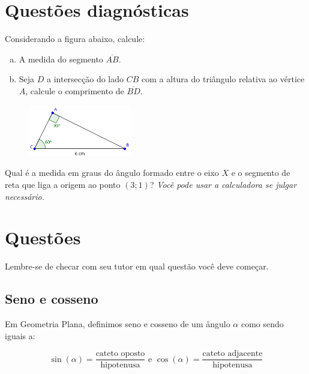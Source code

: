 \documentclass[main.tex]{subfiles}
\begin{document}
\newpage

\section{Questões diagnósticas}

\begin{diagnostico}
Considerando a figura abaixo, calcule:
\begin{enumerate}[a)]
  \item A medida do segmento $\overline{AB}$.
  \item Seja $D$ a intersecção do lado $CB$ com a altura do triângulo relativa ao vértice $A$, calcule o comprimento de $\overline{BD}$.
\end{enumerate}
\end{diagnostico}
 
\begin{figure}[h]
\centering
\includegraphics[width=0.4\textwidth]{./img/c4d1.png}
\end{figure}

\begin{diagnostico}
Qual é a medida em graus do ângulo formado entre o eixo $X$ e o segmento de reta que liga a origem ao ponto $(3;1)$? \textit{Você pode usar a calculadora se julgar necessário.}
\end{diagnostico}

\newpage

\section{Questões}

Lembre-se de checar com seu tutor em qual questão você deve começar.

\subsection*{Seno e cosseno}

Em Geometria Plana, definimos seno e cosseno de um ângulo $\alpha$ como sendo iguais a:

\begin{caixaExemplo}
$$ \sin(\alpha) = \frac{\text{cateto oposto}}{\text{hipotenusa}} \text{ e } \cos(\alpha) = \frac{\text{cateto adjacente}}{\text{hipotenusa}}$$
\end{caixaExemplo}
\end{document}
